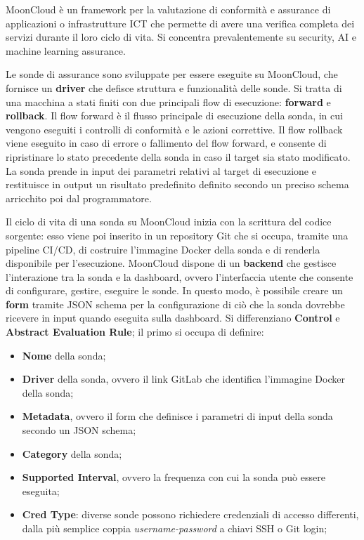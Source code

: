 MoonCloud \cite{8647247} è un framework per la valutazione di conformità e assurance di applicazioni o infrastrutture ICT che permette di avere una verifica completa dei servizi durante il loro ciclo di vita. Si concentra prevalentemente su security, AI e machine learning assurance.

Le sonde di assurance sono sviluppate per essere eseguite su MoonCloud, che fornisce un \textbf{driver} che defisce struttura e funzionalità delle sonde. Si tratta di una macchina a stati finiti con due principali flow di esecuzione: \textbf{forward} e \textbf{rollback}. Il flow forward è il flusso principale di esecuzione della sonda, in cui vengono eseguiti i controlli di conformità e le azioni correttive. Il flow rollback viene eseguito in caso di errore o fallimento del flow forward, e consente di ripristinare lo stato precedente della sonda in caso il target sia stato modificato. La sonda prende in input dei parametri relativi al target di esecuzione e restituisce in output un risultato predefinito definito secondo un preciso schema arricchito poi dal programmatore.

Il ciclo di vita di una sonda su MoonCloud inizia con la scrittura del codice sorgente: esso viene poi inserito in un repository Git che si occupa, tramite una pipeline CI/CD, di costruire l'immagine Docker della sonda e di renderla disponibile per l'esecuzione. MoonCloud dispone di un \textbf{backend} che gestisce l'interazione tra la sonda e la dashboard, ovvero l'interfaccia utente che consente di configurare, gestire, eseguire le sonde. In questo modo, è possibile creare un \textbf{form} tramite JSON schema per la configurazione di ciò che la sonda dovrebbe ricevere in input quando eseguita sulla dashboard. Si differenziano \textbf{Control} e \textbf{Abstract Evaluation Rule};
il primo si occupa di definire:

\begin{itemize}
    \item \textbf{Nome} della sonda;
    \item \textbf{Driver} della sonda, ovvero il link GitLab che identifica l'immagine Docker della sonda;
    \item \textbf{Metadata}, ovvero il form che definisce i parametri di input della sonda secondo un JSON schema;
    \item \textbf{Category} della sonda;
    \item \textbf{Supported Interval}, ovvero la frequenza con cui la sonda può essere eseguita;
    \item \textbf{Cred Type}: diverse sonde possono richiedere credenziali di accesso differenti, dalla più semplice coppia \textit{username-password} a chiavi SSH o Git login;
\end{itemize}

